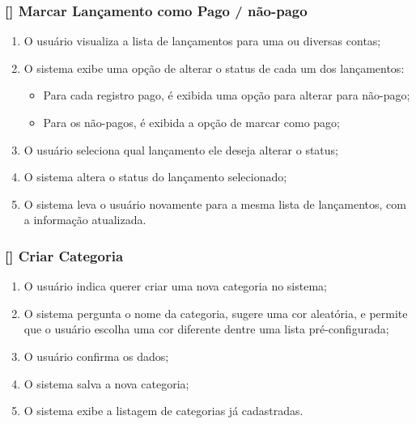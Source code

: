 \documentclass[a4paper]{abnt}
\begin{document}
\subsubsection{[\UC] Marcar Lançamento como Pago / não-pago}
\begin{enumerate}[itemsep=-1ex]
	\item O usuário visualiza a lista de lançamentos para uma ou diversas contas;
	\item O sistema exibe uma opção de alterar o status de cada um dos lançamentos:
		\begin{itemize}[itemsep=-1ex,topsep=-1ex]
			\item Para cada registro pago, é exibida uma opção para alterar para não-pago;
			\item Para os não-pagos, é exibida a opção de marcar como pago;
		\end{itemize}
	\item O usuário seleciona qual lançamento ele deseja alterar o status;
	\item O sistema altera o status do lançamento selecionado;
	\item O sistema leva o usuário novamente para a mesma lista de lançamentos, com a informação atualizada.
\end{enumerate}

\subsubsection{[\UC] Criar Categoria}
\begin{enumerate}[itemsep=-1ex]
	\item O usuário indica querer criar uma nova categoria no sistema;
	\item O sistema pergunta o nome da categoria, sugere uma cor aleatória, e permite que o usuário escolha uma cor diferente dentre uma lista pré-configurada;
	\item O usuário confirma os dados;
	\item O sistema salva a nova categoria;
	\item O sistema exibe a listagem de categorias já cadastradas.
\end{enumerate}
\end{document}
